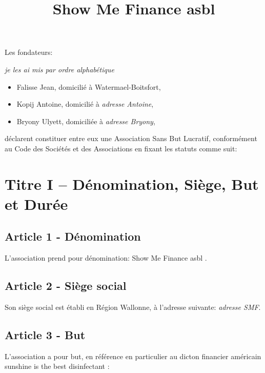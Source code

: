 \documentclass[12pt]{article}
\title{Show Me Finance asbl}
\begin{document}
\maketitle




Les fondateurs:

\emph{je les ai mis par ordre alphabétique}
\begin{itemize}
\item Falisse Jean, domicilié à Watermael-Boitsfort,
\item Kopij Antoine, domicilié à \emph{adresse Antoine},
\item Bryony Ulyett, domiciliée à \emph{adresse Bryony},
\end{itemize}
déclarent constituer entre eux une Association Sans But Lucratif, conformément au Code des Sociétés et des Associations en fixant les statuts comme suit:

\section*{Titre I – Dénomination, Siège, But et Durée}
\subsection*{Article 1 - Dénomination}
L'association prend pour dénomination: \og Show Me Finance asbl \fg .

\subsection*{Article 2 - Siège social}
Son siège social est établi en Région Wallonne, à l'adresse suivante:
\emph{adresse SMF}.
\subsection*{Article 3 - But}
L'association a pour but, en référence en particulier au dicton financier américain \og sunshine is the best disinfectant \fg :
\end{document}
